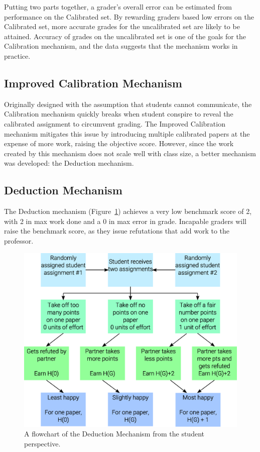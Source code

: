 \documentclass{sigchi}
\begin{document}
Putting two parts together, a grader's overall error can be estimated from performance on the Calibrated set. By rewarding graders based low errors on the Calibrated set, more accurate grades for the uncalibrated set are likely to be attained. Accuracy of grades on the uncalibrated set is one of the goals for the Calibration mechanism, and the data suggests that the mechanism works in practice.

\subsection{Improved Calibration Mechanism}
Originally designed with the assumption that students cannot communicate, the Calibration mechanism quickly breaks when student conspire to reveal the calibrated assignment to circumvent grading. The Improved Calibration mechanism mitigates this issue by introducing multiple calibrated papers at the expense of more work, raising the objective score. However, since the work created by this mechanism does not scale well with class size, a better mechanism was developed: the Deduction mechanism.

\subsection{Deduction Mechanism}

The Deduction mechanism (Figure~\ref{fig:deduction}) achieves a very low benchmark score of 2, with 2 in max work done and a 0 in max error in grade. Incapable graders will raise the benchmark score, as they issue refutations that add work to the professor.

\begin{figure}[!h]
\centering
\includegraphics[width=0.9\columnwidth]{Deduction-Flowchart.eps}
\caption{A flowchart of the Deduction Mechanism from the student perspective.}
\label{fig:deduction}
\end{figure}
\end{document}
